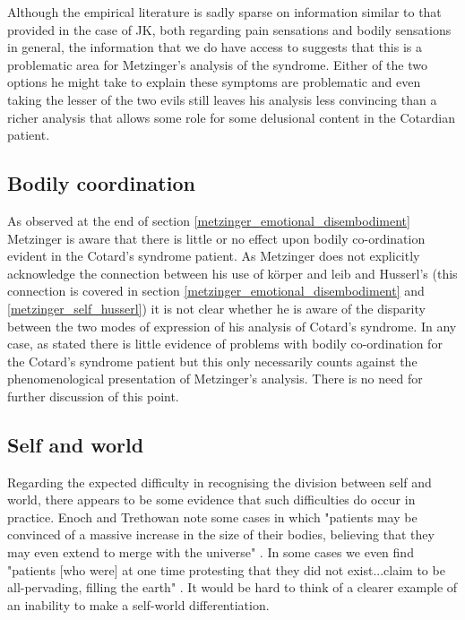 Although the empirical literature is sadly sparse on information similar to that provided in the case of JK, both regarding pain sensations and bodily sensations in general, the information that we do have access to suggests that this is a problematic area for Metzinger's analysis of the syndrome. Either of the two options he might take to explain these symptoms are problematic and even taking the lesser of the two evils still leaves his analysis less convincing than a richer analysis that allows some role for some delusional content in the Cotardian patient.

\subsection{Bodily coordination}

As observed at the end of section \ref{metzinger_emotional_disembodiment} Metzinger is aware that there is little or no effect upon bodily co-ordination evident in the Cotard's syndrome patient. As Metzinger does not explicitly acknowledge the connection between his use of körper and leib and Husserl's (this connection is covered in section \ref{metzinger_emotional_disembodiment} and \ref{metzinger_self_husserl}) it is not clear whether he is aware of the disparity between the two modes of expression of his analysis of Cotard's syndrome. In any case, as stated there is little evidence of problems with bodily co-ordination for the Cotard's syndrome patient but this only necessarily counts against the phenomenological presentation of Metzinger's analysis. There is no need for further discussion of this point.

\subsection{Self and world}

Regarding the expected difficulty in recognising the division between self and world, there appears to be some evidence that such difficulties do occur in practice. Enoch and Trethowan note some cases in which "patients may be convinced of a massive increase in the size of their bodies, believing that they may even extend to merge with the universe" \cite[p. 174]{enoch1991}. In some cases we even find "patients [who were] at one time protesting that they did not exist...claim to be all-pervading, filling the earth" \cite[p. 174]{enoch1991}. It would be hard to think of a clearer example of an inability to make a self-world differentiation.

